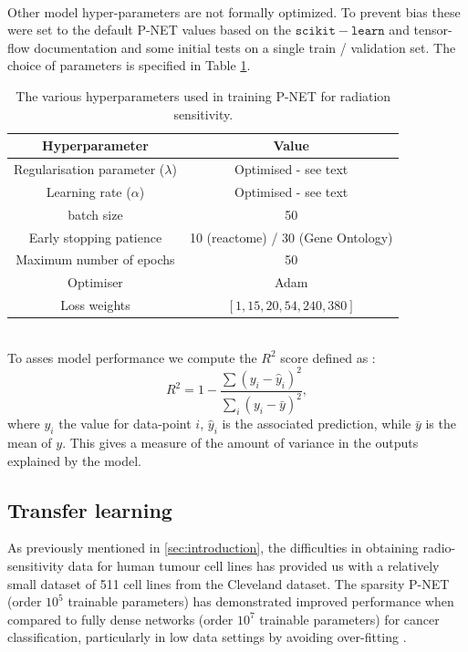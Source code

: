 \documentclass[NOTE, disdraft=true, UKenglish]{\DISCDTLATEXPATH UCLCDTDISdoc}
\begin{document}
\\ \indent Other model hyper-parameters are not formally optimized. To prevent bias these were set to the default P-NET values based on the $\mathtt{scikit-learn}$ and tensor-flow documentation and some initial tests on a single train / validation set. 
The choice of parameters is specified in Table \ref{tab:hyperpars}.
\begin{table}[]
    \centering
    \begin{tabular}{c|c}
       Hyperparameter  &  Value \\ \hline
       Regularisation parameter ($\lambda$) & Optimised - see text \\
       Learning rate ($\alpha$)  & Optimised - see text \\
      batch size  & 50 \\
      Early stopping patience &  10 (reactome) / 30 (Gene Ontology) \\
     Maximum number of epochs &  50 \\
     Optimiser &   Adam \\
     Loss weights &  $[1, 15, 20, 54, 240, 380]$ 
    \end{tabular}
    \caption{The various hyperparameters used in training P-NET for radiation sensitivity.}
    \label{tab:hyperpars}
\end{table}

\\ \indent To asses model performance we compute the $R^2$ score defined as \cite{scikit-learn-docs}:
\begin{equation}
    R^2 = 1-\frac{\sum (y_i - \hat{y}_i)^2}{\sum_i (y_i - \bar{y})^2},
\end{equation}
where $y_i$ the value for data-point $i$, $\hat{y}_i$ is the associated prediction, while $\bar{y}$ is the mean of $y$. This gives a measure of the amount of variance in the outputs explained by the model.
%



\subsection{Transfer learning}
As previously mentioned in \ref{sec:introduction}, the difficulties in obtaining radio-sensitivity data for human tumour cell lines has provided us with a relatively small dataset of 511 cell lines from the Cleveland dataset. The sparsity P-NET (order $10^5$ trainable parameters) has demonstrated improved performance when compared to fully dense networks (order $10^7$ trainable parameters) for cancer classification, particularly in low data settings by avoiding over-fitting \cite{elmarakeby_biologically_2021}. 
\end{document}

